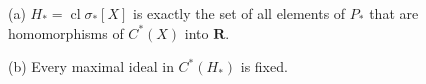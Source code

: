 (a) $H_* = \operatorname{cl} \sigma_*[X]$ is exactly the set of all elements of $P_*$ that are homomorphisms of $C^*(X)$ into $\mathbf{R}$.

(b) Every maximal ideal in $C^*(H_*)$ is fixed.
